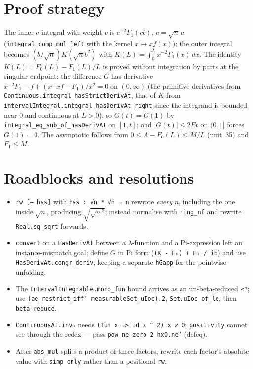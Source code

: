 \documentclass[11pt]{article}
\begin{document}
\section{Proof strategy}
The inner $v$-integral with weight $v$ is $c^{-2}F_1(cb)$, $c=\sqrt n\,u$
(\texttt{integral\_comp\_mul\_left} with the kernel $x\mapsto xf(x)$); the outer integral becomes
$(b/\sqrt n)K(\sqrt nb^2)$ with $K(L)=\int_0^Lx^{-2}F_1(x)\,dx$. The identity $K(L)=F_0(L)-F_1(L)/L$ is
proved without integration by parts at the singular endpoint: the difference $G$ has derivative
$x^{-2}F_1-f+(x\cdot xf-F_1)/x^2=0$ on $(0,\infty)$ (the primitive derivatives from
\texttt{Continuous.integral\_hasStrictDerivAt}, that of $K$ from
\texttt{intervalIntegral.integral\_hasDerivAt\_right} since the integrand is bounded near $0$ and
continuous at $L>0$), so $G(t)=G(1)$ by \texttt{integral\_eq\_sub\_of\_hasDerivAt} on $[1,t]$; and
$|G(t)|\le2Et$ on $(0,1]$ forces $G(1)=0$. The asymptotic follows from $0\le A-F_0(L)\le M/L$ (unit~35)
and $F_1\le M$.

\section{Roadblocks and resolutions}
\begin{itemize}
\item \texttt{rw [← hss]} with \texttt{hss : √n * √n = n} rewrote \emph{every} $n$, including the one
inside $\sqrt n$, producing $\sqrt{\sqrt n^2}$; instead normalise with \texttt{ring\_nf} and rewrite
\texttt{Real.sq\_sqrt} forwards.
\item \texttt{convert} on a \texttt{HasDerivAt} between a $\lambda$-function and a Pi-expression left
an instance-mismatch goal; define $G$ in Pi form (\texttt{(K - F₀) + F₁ / id}) and use
\texttt{HasDerivAt.congr\_deriv}, keeping a separate \texttt{hGapp} for the pointwise unfolding.
\item The \texttt{IntervalIntegrable.mono\_fun} bound arrives as an un-beta-reduced \texttt{≤ᵐ}; use
\texttt{(ae\_restrict\_iff' measurableSet\_uIoc).2}, \texttt{Set.uIoc\_of\_le}, then \texttt{beta\_reduce}.
\item \texttt{ContinuousAt.inv₀} needs \texttt{(fun x => id x \^{} 2) x ≠ 0}; \texttt{positivity} cannot
see through the redex --- pass \texttt{pow\_ne\_zero 2 hx0.ne'} (defeq).
\item After \texttt{abs\_mul} splits a product of three factors, rewrite each factor's absolute value
with \texttt{simp only} rather than a positional \texttt{rw}.
\end{itemize}
\end{document}
